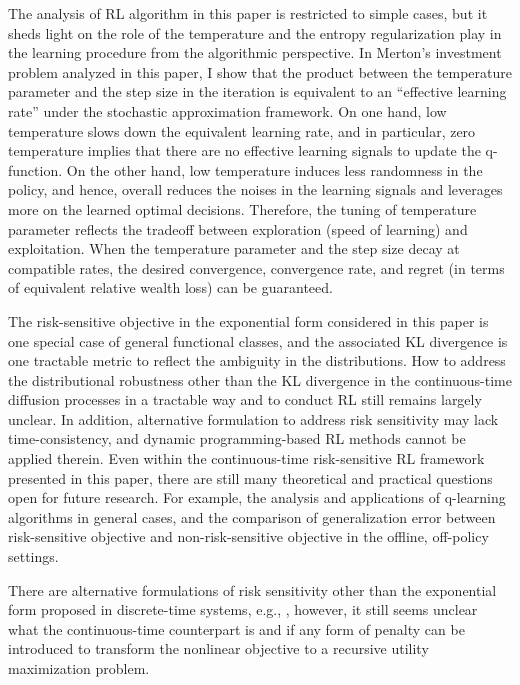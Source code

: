 The analysis of RL algorithm in this paper is restricted to simple cases, but it sheds light on the role of the temperature and the entropy regularization play in the learning procedure from the algorithmic perspective. In Merton's investment problem analyzed in this paper, I show that the product between the temperature parameter and the step size in the iteration is equivalent to an ``effective learning rate'' under the stochastic approximation framework. On one hand, low temperature slows down the equivalent learning rate, and in particular, zero temperature implies that there are no effective learning signals to update the q-function. On the other hand, low temperature induces less randomness in the policy, and hence, overall reduces the noises in the learning signals and leverages more on the learned optimal decisions. Therefore, the tuning of temperature parameter reflects the tradeoff between exploration (speed of learning) and exploitation. When the temperature parameter and the step size decay at compatible rates, the desired convergence, convergence rate, and regret (in terms of equivalent relative wealth loss) can be guaranteed.


The risk-sensitive objective in the exponential form considered in this paper is one special case of general functional classes, and the associated KL divergence is one tractable metric to reflect the ambiguity in the distributions. How to address the distributional robustness other than the KL divergence in the continuous-time diffusion processes in a tractable way and to conduct RL still remains largely unclear. In addition, alternative formulation to address risk sensitivity may lack time-consistency, and dynamic programming-based RL methods cannot be applied therein. Even within the continuous-time risk-sensitive RL framework presented in this paper, there are still many theoretical and practical questions open for future research. For example, the analysis and applications of q-learning algorithms in general cases, and the comparison of generalization error between risk-sensitive objective and non-risk-sensitive objective in the offline, off-policy settings. 

There are alternative formulations of risk sensitivity other than the exponential form proposed in discrete-time systems, e.g., \cite{xu2023regret,wu2023risk}, however, it still seems unclear what the continuous-time counterpart is and if any form of penalty can be introduced to transform the nonlinear objective to a recursive utility maximization problem. 



